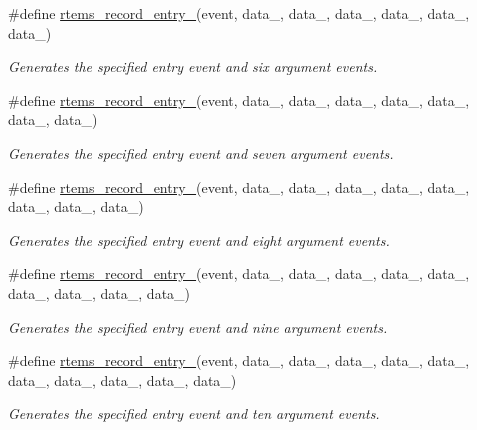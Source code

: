 \begin{DoxyCompactItemize}
\#define \mbox{\hyperlink{group__RTEMSRecord_ga2ae5b63fb0b3c9d12b48441fe7ac0b65}{rtems\+\_\+record\+\_\+entry\+\_}}(event,  data\+\_,  data\+\_,  data\+\_,  data\+\_,  data\+\_,  data\+\_)
\begin{DoxyCompactList}\small\item\em Generates the specified entry event and six argument events. \end{DoxyCompactList}\item 
\#define \mbox{\hyperlink{group__RTEMSRecord_ga34fa5ce70605bad63d77d1c3b573f4f0}{rtems\+\_\+record\+\_\+entry\+\_}}(event,  data\+\_,  data\+\_,  data\+\_,  data\+\_,  data\+\_,  data\+\_,  data\+\_)
\begin{DoxyCompactList}\small\item\em Generates the specified entry event and seven argument events. \end{DoxyCompactList}\item 
\#define \mbox{\hyperlink{group__RTEMSRecord_ga97d70c6f5b1f0bf6a489a6de00a4ab12}{rtems\+\_\+record\+\_\+entry\+\_}}(event,  data\+\_,  data\+\_,  data\+\_,  data\+\_,  data\+\_,  data\+\_,  data\+\_,  data\+\_)
\begin{DoxyCompactList}\small\item\em Generates the specified entry event and eight argument events. \end{DoxyCompactList}\item 
\#define \mbox{\hyperlink{group__RTEMSRecord_gab8501ca5b0944f1c681b015259010526}{rtems\+\_\+record\+\_\+entry\+\_}}(event,  data\+\_,  data\+\_,  data\+\_,  data\+\_,  data\+\_,  data\+\_,  data\+\_,  data\+\_,  data\+\_)
\begin{DoxyCompactList}\small\item\em Generates the specified entry event and nine argument events. \end{DoxyCompactList}\item 
\#define \mbox{\hyperlink{group__RTEMSRecord_ga77b28bbc6adb1973946c1c849ef621eb}{rtems\+\_\+record\+\_\+entry\+\_}}(event,  data\+\_,  data\+\_,  data\+\_,  data\+\_,  data\+\_,  data\+\_,  data\+\_,  data\+\_,  data\+\_,  data\+\_)
\begin{DoxyCompactList}\small\item\em Generates the specified entry event and ten argument events. \end{DoxyCompactList}\item 

\end{DoxyCompactItemize}
